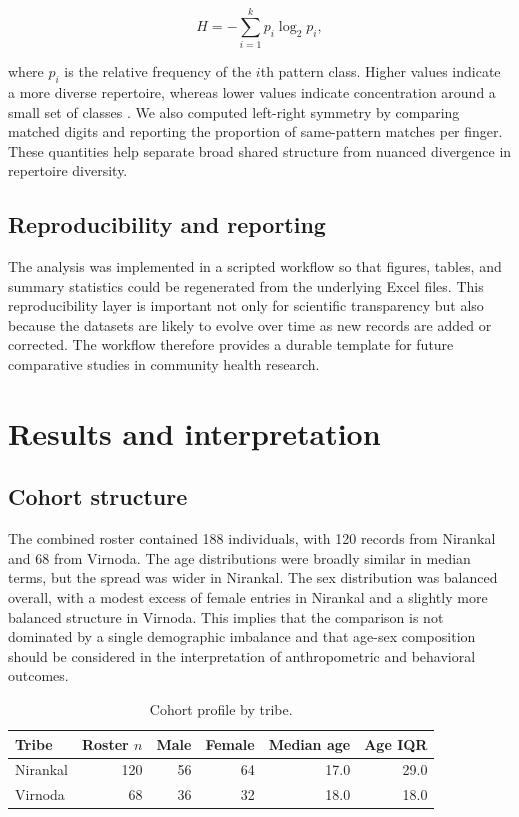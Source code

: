 \documentclass[11pt]{article}
\begin{document}
\begin{equation}
H = -\sum_{i=1}^{k} p_i \log_2 p_i,
\end{equation}

where $p_i$ is the relative frequency of the $i$th pattern class. Higher values indicate a more diverse repertoire, whereas lower values indicate concentration around a small set of classes \cite{shannon1948}. We also computed left-right symmetry by comparing matched digits and reporting the proportion of same-pattern matches per finger. These quantities help separate broad shared structure from nuanced divergence in repertoire diversity.

\subsection{Reproducibility and reporting}
The analysis was implemented in a scripted workflow so that figures, tables, and summary statistics could be regenerated from the underlying Excel files. This reproducibility layer is important not only for scientific transparency but also because the datasets are likely to evolve over time as new records are added or corrected. The workflow therefore provides a durable template for future comparative studies in community health research.

\section{Results and interpretation}
\subsection{Cohort structure}
The combined roster contained 188 individuals, with 120 records from Nirankal and 68 from Virnoda. The age distributions were broadly similar in median terms, but the spread was wider in Nirankal. The sex distribution was balanced overall, with a modest excess of female entries in Nirankal and a slightly more balanced structure in Virnoda. This implies that the comparison is not dominated by a single demographic imbalance and that age-sex composition should be considered in the interpretation of anthropometric and behavioral outcomes.

\begin{table}[H]
\centering
\caption{Cohort profile by tribe.}
\begin{tabular}{lrrrrr}
\toprule
Tribe & Roster $n$ & Male & Female & Median age & Age IQR \\
\midrule
Nirankal & 120 & 56 & 64 & 17.0 & 29.0 \\
Virnoda & 68 & 36 & 32 & 18.0 & 18.0 \\
\bottomrule
\end{tabular}
\end{table}
\end{document}
